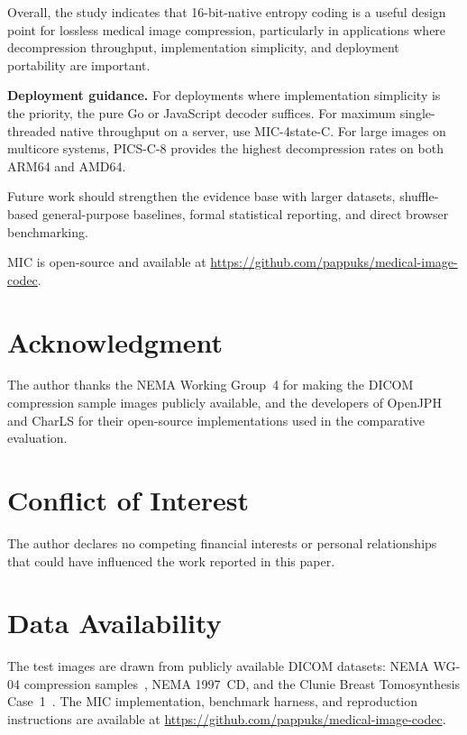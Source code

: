 \documentclass[journal]{IEEEtran}
\begin{document}
Overall, the study indicates that 16-bit-native entropy coding is a useful
design point for lossless medical image compression, particularly in
applications where decompression throughput, implementation simplicity, and
deployment portability are important.

\textbf{Deployment guidance.} For deployments where implementation simplicity
is the priority, the pure Go or JavaScript decoder suffices. For maximum
single-threaded native throughput on a server, use MIC-4state-C. For large
images on multicore systems, PICS-C-8 provides the highest decompression rates
on both ARM64 and AMD64.

Future work should strengthen the evidence base with larger datasets,
shuffle-based general-purpose baselines, formal statistical reporting, and
direct browser benchmarking.

MIC is open-source and available at
\url{https://github.com/pappuks/medical-image-codec}.

\section*{Acknowledgment}

The author thanks the NEMA Working Group~4 for making the DICOM compression
sample images publicly available, and the developers of OpenJPH and CharLS for
their open-source implementations used in the comparative evaluation.

\section*{Conflict of Interest}

The author declares no competing financial interests or personal relationships
that could have influenced the work reported in this paper.

\section*{Data Availability}

The test images are drawn from publicly available DICOM datasets:
NEMA WG-04 compression samples~\cite{nema_wg04}, NEMA 1997~CD, and the
Clunie Breast Tomosynthesis Case~1~\cite{clunie_tomo}. The MIC implementation,
benchmark harness, and reproduction instructions are available at
\url{https://github.com/pappuks/medical-image-codec}.
\end{document}
